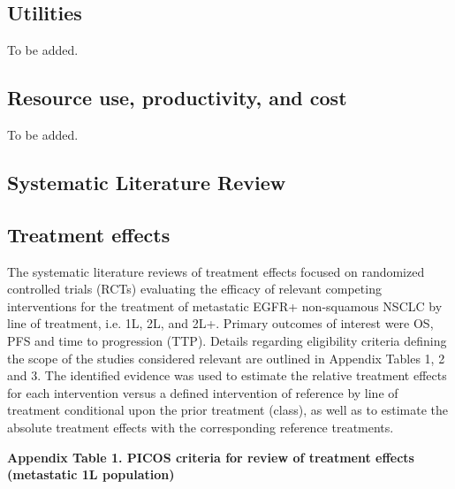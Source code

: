 \documentclass[11pt,final,fleqn]{article}\usepackage[]{graphicx}\usepackage[]{color}
\theoremstyle{plain}
\begin{document}
{\subsection{Utilities}\label{subsec:data-utility}
To be added.

\subsection{Resource use, productivity, and cost}\label{subsec:data-costs}
To be added.


\begin{appendices}
\setcounter{table}{0}
\renewcommand{\thetable}{A\arabic{table}}
\setcounter{figure}{0}
\renewcommand{\thefigure}{A\arabic{figure}}
\setcounter{equation}{0}
\renewcommand{\theequation}{A\arabic{equation}}

\section{Systematic Literature Review}\label{app:slr}

\subsection{Treatment effects}

The systematic literature reviews of treatment effects focused on randomized controlled trials (RCTs) evaluating the efficacy of relevant competing interventions for the treatment of metastatic EGFR+ non-squamous NSCLC by line of treatment, i.e. 1L, 2L, and 2L+. Primary outcomes of interest were OS, PFS and time to progression (TTP). Details regarding eligibility criteria defining the scope of the studies considered relevant are outlined in Appendix Tables 1, 2 and 3. The identified evidence was used to estimate the relative treatment effects for each intervention versus a defined intervention of reference by line of treatment conditional upon the prior treatment (class), as well as to estimate the absolute treatment effects with the corresponding reference treatments.

\textbf{Appendix Table 1. PICOS criteria for review of treatment effects (metastatic 1L population)}


\end{appendices}}
\end{document}
